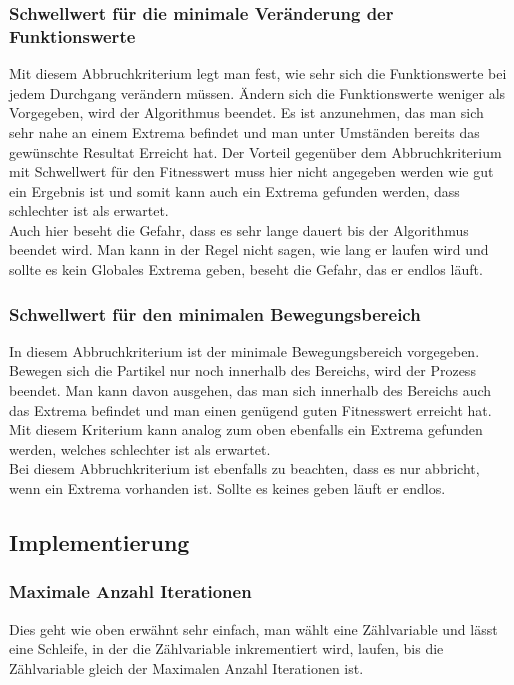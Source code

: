 \subsubsection{Schwellwert für die minimale Veränderung der Funktionswerte}
Mit diesem Abbruchkriterium legt man fest, wie sehr sich die Funktionswerte bei jedem Durchgang verändern müssen. Ändern sich die Funktionswerte weniger als Vorgegeben, wird der Algorithmus beendet. Es ist anzunehmen, das man sich sehr nahe an einem Extrema befindet und man unter Umständen bereits das gewünschte Resultat Erreicht hat. Der Vorteil gegenüber dem Abbruchkriterium mit Schwellwert für den Fitnesswert muss hier nicht angegeben werden wie gut ein Ergebnis ist und somit kann auch ein Extrema gefunden werden, dass schlechter ist als erwartet. \\ 
Auch hier beseht die Gefahr, dass es sehr lange dauert bis der Algorithmus beendet wird. Man kann in der Regel nicht sagen, wie lang er laufen wird und sollte es kein Globales Extrema geben, beseht die Gefahr, das er endlos läuft. 

\subsubsection{Schwellwert für den minimalen Bewegungsbereich}
In diesem Abbruchkriterium ist der minimale Bewegungsbereich vorgegeben. Bewegen sich die Partikel nur noch innerhalb des Bereichs, wird der Prozess beendet. Man kann davon ausgehen, das man sich innerhalb des Bereichs auch das Extrema befindet und man einen genügend guten Fitnesswert erreicht hat. Mit diesem Kriterium kann analog zum oben ebenfalls ein Extrema gefunden werden, welches schlechter ist als erwartet.\\
Bei diesem Abbruchkriterium ist ebenfalls zu beachten, dass es nur abbricht, wenn ein Extrema vorhanden ist. Sollte es keines geben läuft er endlos.

\subsection{Implementierung}
\subsubsection{Maximale Anzahl Iterationen}
Dies geht wie oben erwähnt sehr einfach, man wählt eine Zählvariable und lässt eine Schleife, in der die Zählvariable inkrementiert wird, laufen, bis die Zählvariable gleich der Maximalen Anzahl Iterationen ist.

